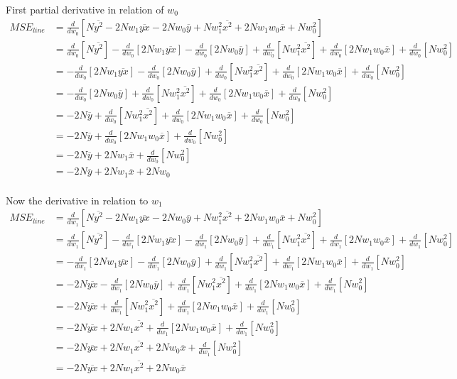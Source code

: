 \documentclass[10pt,a4paper]{article}
\newcommand*\mean[1]{\overline{#1}}
\begin{document}
	First partial derivative in relation of $w_0$
	\begin{align*}
		MSE_{line}&=\frac{d}{dw_0}[N\mean{y^2}-2Nw_1\mean{yx}-2Nw_0\mean{y}+Nw_1^2\mean{x^2}+2Nw_1w_0\mean{x}+Nw_0^2]\\
		&=\frac{d}{dw_0}[N\mean{y^2}]-\frac{d}{dw_0}[2Nw_1\mean{yx}]-\frac{d}{dw_0}[2Nw_0\mean{y}]+\frac{d}{dw_0}[Nw_1^2\mean{x^2}]+\frac{d}{dw_0}[2Nw_1w_0\mean{x}]+\frac{d}{dw_0}[Nw_0^2]\\
		&=-\frac{d}{dw_0}[2Nw_1\mean{yx}]-\frac{d}{dw_0}[2Nw_0\mean{y}]+\frac{d}{dw_0}[Nw_1^2\mean{x^2}]+\frac{d}{dw_0}[2Nw_1w_0\mean{x}]+\frac{d}{dw_0}[Nw_0^2]\\
		&=-\frac{d}{dw_0}[2Nw_0\mean{y}]+\frac{d}{dw_0}[Nw_1^2\mean{x^2}]+\frac{d}{dw_0}[2Nw_1w_0\mean{x}]+\frac{d}{dw_0}[Nw_0^2]\\
		&=-2N\mean{y}+\frac{d}{dw_0}[Nw_1^2\mean{x^2}]+\frac{d}{dw_0}[2Nw_1w_0\mean{x}]+\frac{d}{dw_0}[Nw_0^2]\\
		&=-2N\mean{y}+\frac{d}{dw_0}[2Nw_1w_0\mean{x}]+\frac{d}{dw_0}[Nw_0^2]\\
		&=-2N\mean{y}+2Nw_1\mean{x}+\frac{d}{dw_0}[Nw_0^2]\\
		&=-2N\mean{y}+2Nw_1\mean{x}+2Nw_0\\
	\end{align*}
	
	Now the derivative in relation to $w_1$
	\begin{align*}
		MSE_{line}&=\frac{d}{dw_1}[N\mean{y^2}-2Nw_1\mean{yx}-2Nw_0\mean{y}+Nw_1^2\mean{x^2}+2Nw_1w_0\mean{x}+Nw_0^2]\\
		&=\frac{d}{dw_1}[N\mean{y^2}]-\frac{d}{dw_1}[2Nw_1\mean{yx}]-\frac{d}{dw_1}[2Nw_0\mean{y}]+\frac{d}{dw_1}[Nw_1^2\mean{x^2}]+\frac{d}{dw_1}[2Nw_1w_0\mean{x}]+\frac{d}{dw_1}[Nw_0^2]\\
		&=-\frac{d}{dw_1}[2Nw_1\mean{yx}]-\frac{d}{dw_1}[2Nw_0\mean{y}]+\frac{d}{dw_1}[Nw_1^2\mean{x^2}]+\frac{d}{dw_1}[2Nw_1w_0\mean{x}]+\frac{d}{dw_1}[Nw_0^2]\\
		&=-2N\mean{yx}-\frac{d}{dw_1}[2Nw_0\mean{y}]+\frac{d}{dw_1}[Nw_1^2\mean{x^2}]+\frac{d}{dw_1}[2Nw_1w_0\mean{x}]+\frac{d}{dw_1}[Nw_0^2]\\
		&=-2N\mean{yx}+\frac{d}{dw_1}[Nw_1^2\mean{x^2}]+\frac{d}{dw_1}[2Nw_1w_0\mean{x}]+\frac{d}{dw_1}[Nw_0^2]\\
		&=-2N\mean{yx}+2Nw_1\mean{x^2}+\frac{d}{dw_1}[2Nw_1w_0\mean{x}]+\frac{d}{dw_1}[Nw_0^2]\\
		&=-2N\mean{yx}+2Nw_1\mean{x^2}+2Nw_0\mean{x}+\frac{d}{dw_1}[Nw_0^2]\\
		&=-2N\mean{yx}+2Nw_1\mean{x^2}+2Nw_0\mean{x}\\		
	\end{align*}
	
\end{document}
